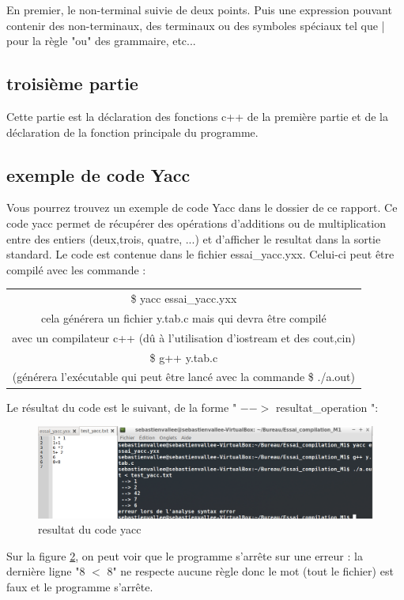En premier, le non-terminal suivie de deux points. Puis une expression pouvant contenir des non-terminaux, des terminaux ou des symboles spéciaux tel que | pour la règle "ou" des grammaire, etc...

\subsection{troisième partie}
Cette partie est la déclaration des fonctions c++ de la première partie et de la déclaration de la fonction principale du programme.

\subsection{exemple de code Yacc}
Vous pourrez trouvez un exemple de code Yacc dans le dossier de ce rapport.
Ce code yacc permet de récupérer des opérations d'additions ou de multiplication entre des entiers (deux,trois, quatre, ...) et d'afficher le resultat dans la sortie standard. Le code est contenue dans le fichier essai\_yacc.yxx.
Celui-ci peut être compilé avec les commande :\newline

\begin{tabular}{|c|}
    \hline
        \$ yacc essai\_yacc.yxx \\
        cela générera un fichier y.tab.c mais qui devra être compilé \\
         avec un compilateur c++ (dû à l'utilisation d'iostream et des cout,cin)\\
    \hline
        \$ g++ y.tab.c \\
        (générera l'exécutable qui peut être lancé avec la commande \$ ./a.out) \\
    \hline
\end{tabular}
\newline

Le résultat du code est le suivant, de la forme " $-->$ resultat\_operation ":
\newline

\begin{figure}[h]
    \centerline{\includegraphics[scale=0.7]{data/yacc}}
    \caption{resultat du code yacc}
    \label{fig:yacc}
\end{figure}

Sur la figure \href{fig:yacc}{2}, on peut voir que le programme s'arrête sur une erreur : la dernière ligne "8 $<$ 8" ne respecte aucune règle donc le mot (tout le fichier) est faux et le programme s'arrête.

\newpage